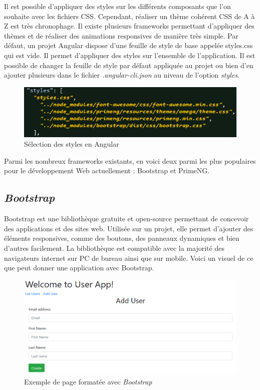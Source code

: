 \documentclass{polytech/polytech}
\begin{document}
Il est possible d’appliquer des styles sur les différents composants que l’on souhaite avec les fichiers CSS. Cependant, réaliser un thème cohérent CSS de A à Z est très chronophage. Il existe plusieurs frameworks permettant d’appliquer des thèmes et de réaliser des animations responsives de manière très simple. Par défaut, un projet Angular dispose d’une feuille de style de base appelée styles.css qui est vide. Il permet d’appliquer des styles sur l’ensemble de l’application. Il est possible de changer la feuille de style par défaut appliquée au projet ou bien d’en ajouter plusieurs dans le fichier \textit{.angular-cli.json} au niveau de l’option \textit{styles}.

\begin{figure}
	\includegraphics[scale=0.85]{images/styles_angular-cli}
	\caption{Sélection des styles en Angular}
	\label{fig:stylesAngular}
\end{figure}

Parmi les nombreux frameworks existants, en voici deux parmi les plus populaires pour le développement Web actuellement : Bootstrap et PrimeNG.

\subsection{\textit{Bootstrap}}

Bootstrap est une bibliothèque gratuite et open-source permettant de concevoir des applications et des sites web. Utilisée sur un projet, elle permet d’ajouter des éléments responsives, comme des boutons, des panneaux dynamiques et bien d’autres facilement. La bibliothèque est compatible avec la majorité des navigateurs internet sur PC de bureau ainsi que sur mobile. Voici un visuel de ce que peut donner une application avec Bootstrap. 

\begin{figure}
	\includegraphics[scale=0.6]{images/bootstrap_exemple}
	\caption{Exemple de page formatée avec \textit{Bootstrap}}
	\label{fig:boostrapExemple}
\end{figure}
\end{document}
